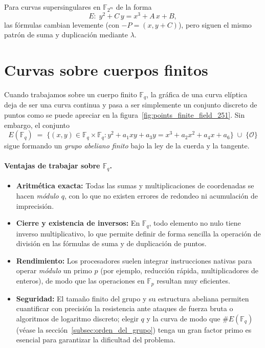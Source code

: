 Para curvas supersingulares en \(\mathbb{F}_{2^m}\) de la forma
\[
  E\colon\;y^2 + C\,y = x^3 + A\,x + B,
\]
las fórmulas cambian levemente (con \(-P=(x,y+C)\)), pero siguen el mismo patrón de suma y duplicación mediante \(\lambda\).

\section{Curvas sobre cuerpos finitos}\label{sec:curvas_sobre_cuerpos_finitos}
Cuando trabajamos sobre un cuerpo finito \(\mathbb{F}_q\), la gráfica de una curva elíptica deja de ser una curva continua y pasa a ser simplemente un conjunto discreto de puntos como se puede apreciar en la figura~\ref{fig:points_finite_field_251}. Sin embargo, el conjunto
\[
  E(\mathbb{F}_q)
  \;=\;
  \bigl\{(x,y)\in\mathbb{F}_q\times\mathbb{F}_q : y^2 + a_1xy + a_3y = x^3 + a_2x^2 + a_4x + a_6\bigr\}\;\cup\;\{\mathcal{O}\}
\]
sigue formando un \emph{grupo abeliano finito} bajo la ley de la cuerda y la tangente.

\paragraph{Ventajas de trabajar sobre \(\mathbb{F}_q\).}
\begin{itemize}
  \item \textbf{Aritmética exacta:} Todas las sumas y multiplicaciones de coordenadas se hacen \emph{módulo \(q\)}, con lo que no existen errores de redondeo ni acumulación de imprecisión.  
  \item \textbf{Cierre y existencia de inversos:} En \(\mathbb{F}_q\), todo elemento no nulo tiene inverso multiplicativo, lo que permite definir de forma sencilla la operación de división en las fórmulas de suma y de duplicación de puntos.  
  \item \textbf{Rendimiento:} Los procesadores suelen integrar instrucciones nativas para operar \emph{módulo} un primo \(p\) (por ejemplo, reducción rápida, multiplicadores de enteros), de modo que las operaciones en \(\mathbb{F}_p\) resultan muy eficientes.  
  \item \textbf{Seguridad:} El tamaño finito del grupo y su estructura abeliana permiten cuantificar con precisión la resistencia ante ataques de fuerza bruta o algoritmos de logaritmo discreto; elegir \(q\) y la curva de modo que \(\#E(\mathbb{F}_q)\) (véase la sección~\ref{subsec:orden_del_grupo}) tenga un gran factor primo es esencial para garantizar la dificultad del problema.  
\end{itemize}

